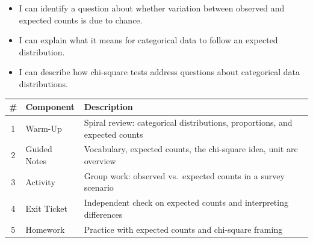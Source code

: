 \documentclass[10pt]{article}
\begin{document}

\vspace{2.4cm}
\namedateperiod

\begin{learningtargetbox}
\begin{itemize}
    \item I can identify a question about whether variation between observed and
          expected counts is due to chance.
    \item I can explain what it means for categorical data to follow an expected
          distribution.
    \item I can describe how chi-square tests address questions about categorical
          data distributions.
\end{itemize}
\end{learningtargetbox}

\begin{tocbox}
\renewcommand{\arraystretch}{1.5}
\begin{tabularx}{\linewidth}{clX}
    \textbf{\#} & \textbf{Component} & \textbf{Description} \\
    \hline
    1 & Warm-Up        & Spiral review: categorical distributions, proportions, and expected counts \\
    2 & Guided Notes   & Vocabulary, expected counts, the chi-square idea, unit arc overview \\
    3 & Activity       & Group work: observed vs.\ expected counts in a survey scenario \\
    4 & Exit Ticket    & Independent check on expected counts and interpreting differences \\
    5 & Homework       & Practice with expected counts and chi-square framing \\
\end{tabularx}
\end{tocbox}
\end{document}
